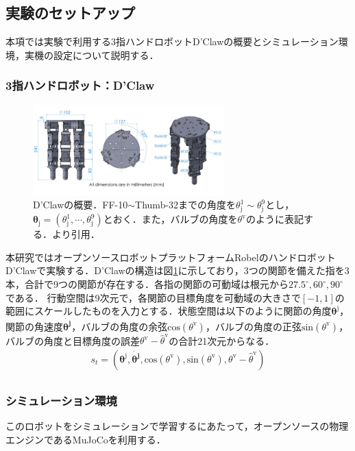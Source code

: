 \documentclass[dvipdfmx]{ampbt_nomag}
\begin{document}
\subsection{実験のセットアップ}
本項では実験で利用する3指ハンドロボットD'Clawの概要とシミュレーション環境，実機の設定について説明する．
\subsubsection{3指ハンドロボット：D'Claw}
\begin{figure}[hbtp]
  \centering
  \includegraphics[height=3.5cm]
       {asset/img/dclaw.pdf}
  \caption{D'Clawの概要．FF-10$\sim$Thumb-32までの角度を$\theta^1_{\textrm{j}}\sim\theta^9_{\textrm{j}}$とし，$\boldsymbol{\theta}_{\textrm{j}}=(\theta^1_{\textrm{j}},\cdots,\theta^9_{\textrm{j}})$とおく．また，バルブの角度を$\theta^{\textrm{v}}$のように表記する．\cite{ahn2020robel}より引用．}
  \label{dclaw_structure}
\end{figure}
 
本研究ではオープンソースロボットプラットフォームRobelのハンドロボットD'Clawで実験する\cite{ahn2020robel}．D'Clawの構造は図\ref{dclaw_structure}に示しており，3つの関節を備えた指を3本，合計で9つの関節が存在する．各指の関節の可動域は根元から$27.5^\circ,60^\circ,90^\circ$である．
行動空間は9次元で，各関節の目標角度を可動域の大きさで$[-1,1]$の範囲にスケールしたものを入力とする．状態空間は以下のように関節の角度$\boldsymbol{\theta}^{\textrm{j}}$，関節の角速度$\dot{\boldsymbol{\theta^{\textrm{j}}}}$，バルブの角度の余弦$\textrm{cos}(\theta^{\textrm{v}})$，バルブの角度の正弦$\textrm{sin}(\theta^{\textrm{v}})$，バルブの角度と目標角度の誤差$\theta^{\textrm{v}} - \hat{\theta}^{\textrm{v}}$の合計21次元からなる．
\begin{eqnarray}\label{state}
  s_t = \left(\boldsymbol{\theta}^{\textrm{j}},\dot{\boldsymbol{\theta^{\textrm{j}}}},\textrm{cos}(\theta^{\textrm{v}}),\textrm{sin}(\theta^{\textrm{v}}),\theta^{\textrm{v}} - \hat{\theta}^{\textrm{v}}\right) \nonumber \\ 
\end{eqnarray}

\subsubsection{シミュレーション環境}
このロボットをシミュレーションで学習するにあたって，オープンソースの物理エンジンであるMuJoCoを利用する\cite{Mujoco}．
\end{document}
